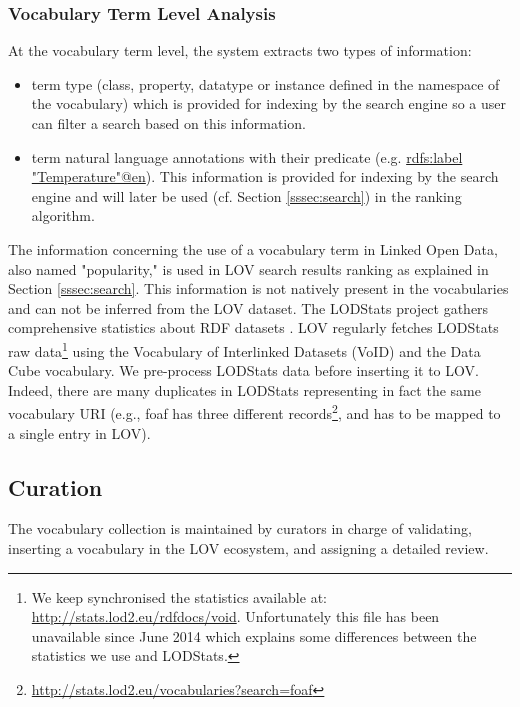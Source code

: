 \documentclass{iosart2c}
\newcommand{\maria}[1]{\textcolor{blue}{\textbf{[MARIA:#1]}}}
\begin{document}
\subsubsection{Vocabulary Term Level Analysis}
At the vocabulary term level, the system extracts two types of information:
\begin{itemize}
\item term type (class, property, datatype or instance defined in the namespace of the vocabulary) which is provided for indexing by the search engine so a user can filter a search based on this information.
\item term natural language annotations with their predicate (e.g. \url{rdfs:label} \url{"Temperature"@en}). This information is provided for indexing by the search engine and will later be used (cf. Section \ref{sssec:search}) in the ranking algorithm.
\end{itemize}

The information concerning the use of a vocabulary term in Linked Open Data, also named "popularity," is used in LOV search results ranking as explained in Section \ref{sssec:search}. This information is not natively present in the vocabularies and can not be inferred from the LOV dataset. The LODStats project gathers comprehensive statistics about RDF datasets \cite{demter-2012-ekaw}. LOV regularly fetches LODStats raw data\footnote{We keep synchronised the statistics available at: \url{http://stats.lod2.eu/rdfdocs/void}. Unfortunately this file has been unavailable since June 2014 which explains some differences between the statistics we use and LODStats.} using the Vocabulary of Interlinked Datasets (VoID) \cite{void2009} and the Data Cube vocabulary. We pre-process LODStats data before inserting it to LOV. Indeed, there are many duplicates in LODStats representing in fact the same vocabulary URI (e.g., foaf has three different records\footnote{\url{http://stats.lod2.eu/vocabularies?search=foaf}}, and has to be mapped to a single entry in LOV).

\subsection{Curation}
The vocabulary collection is maintained by curators in charge of validating, inserting a vocabulary in the LOV ecosystem, and assigning a detailed review.

\end{document}
